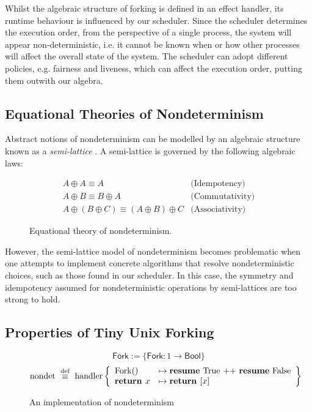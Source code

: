 \documentclass[logo,bsc,singlespacing,parskip]{infthesis}
\begin{document}
Whilst the algebraic structure of forking is defined in an effect handler, its runtime behaviour is influenced by our scheduler. Since the scheduler determines the execution order, from the perspective of a single process, the system will appear non-deterministic, i.e. it cannot be known when or how other processes will affect the overall state of the system. The scheduler can adopt different policies, e.g. fairness and liveness, which can affect the execution order, putting them outwith our algebra.


\subsection{Equational Theories of Nondeterminism}
Abstract notions of nondeterminism can be modelled by an algebraic structure known as a \textit{semi-lattice} \cite{Pretnar:2010}. A semi-lattice is governed by the following algebraic laws:

\begin{figure}[H]
\centering
\[
\begin{array}{ll}
  A \oplus A \equiv A & \text{(Idempotency)} \\
  A \oplus B \equiv B \oplus A & \text{(Commutativity)} \\
  A \oplus (B \oplus C) \equiv (A \oplus B) \oplus C & \text{(Associativity)}
\end{array}
\]
\caption{%
  Equational theory of nondeterminism.
}
\end{figure}



However, the semi-lattice model of nondeterminism becomes problematic when one attempts to implement concrete algorithms that resolve nondeterministic choices, such as those found in our scheduler. In this case, the symmetry and idempotency assumed for nondeterministic operations by semi-lattices are too strong to hold.



\subsection{Properties of Tiny Unix Forking}


\begin{figure}[H]
\centering
\[
\mathsf{Fork} := \{ \mathsf{Fork} : 1 \rightarrow \mathsf{Bool} \}
\]
\vspace{-1em}
\[
\text{nondet} \ \overset{\text{def}}{\equiv} \ \text{handler} \left\{
\begin{array}{ll}
\text{Fork}() &\mapsto \text{\textbf{resume} True ++ \textbf{resume} False} \\
\textbf{return } x &\mapsto \textbf{return } [x]
\end{array}
\right\}
\]
\caption{An implementation of nondeterminism}
\label{nondetImplementation}
\end{figure}
\end{document}
